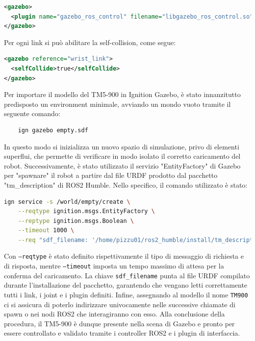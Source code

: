 \documentclass[11pt]{report}
\begin{document}
\begin{lstlisting}[language=xml]
<gazebo>
  <plugin name="gazebo_ros_control" filename="libgazebo_ros_control.so"/>
</gazebo>
\end{lstlisting}
\vspace{1em}
Per ogni link si può abilitare la self-collision, come segue:

\begin{lstlisting}[language=xml]
<gazebo reference="wrist_link">
  <selfCollide>true</selfCollide>
</gazebo>
\end{lstlisting}
\vspace{1em}

Per importare il modello del TM5-900 in Ignition Gazebo, è stato innanzitutto predisposto un environment minimale, avviando un mondo vuoto tramite il seguente comando:  
\begin{verbatim}
    ign gazebo empty.sdf
\end{verbatim}
In questo modo si inizializza un nuovo spazio di simulazione, privo di elementi superflui, che permette di verificare in modo isolato il corretto caricamento del robot. Successivamente, è stato utilizzato il servizio "EntityFactory" di Gazebo per "spawnare" il robot a partire dal file URDF prodotto dal pacchetto "tm\_description" di ROS2 Humble. Nello specifico, il comando utilizzato è stato:  
\begin{lstlisting}[language=bash,breaklines=true]
    ign service -s /world/empty/create \
    --reqtype ignition.msgs.EntityFactory \
    --reptype ignition.msgs.Boolean \
    --timeout 1000 \
    --req "sdf_filename: '/home/pizzu01/ros2_humble/install/tm_description/share/tm_description/urdf/tm900_robot_prova2.urdf', name: 'tm900'"
\end{lstlisting}

Con \texttt{--reqtype} è stato definito rispettivamente il tipo di messaggio di richiesta e di risposta, mentre \texttt{--timeout} imposta un tempo massimo di attesa per la conferma del caricamento. La chiave \texttt{sdf\_filename} punta al file URDF compilato durante l’installazione del pacchetto, garantendo che vengano letti correttamente tutti i link, i joint e i plugin definiti. Infine, assegnando al modello il nome \texttt{TM900} ci si assicura di poterlo indirizzare univocamente nelle successive chiamate di spawn o nei nodi ROS2 che interagiranno con esso. Alla conclusione della procedura, il TM5-900 è dunque presente nella scena di Gazebo e pronto per essere controllato e validato tramite i controller ROS2 e i plugin di interfaccia.
\end{document}
